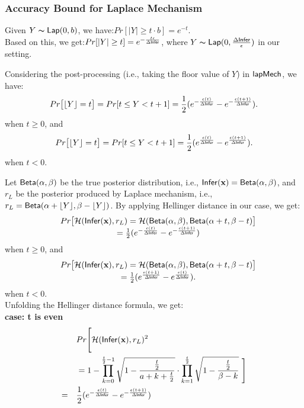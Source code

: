 \documentclass{article}
\begin{document}
\subsubsection{Accuracy Bound for Laplace Mechanism}
\label{subsec_accuracy_lap}
Given $Y \thicksim \mathsf{Lap}(0, b)$, we have\cite{dwork2014algorithmic}:$Pr[|Y| \geq t \cdot b] = e^{- t}.$\\
Based on this, we get:$Pr[|Y| \geq t] = e^{- \frac{t \epsilon}{\Delta \mathsf{Infer}}}$, where $Y \thicksim \mathsf{Lap}(0, \frac{\Delta \mathsf{Infer}}{\epsilon})$ in our setting.

Considering the post-processing (i.e., taking the floor value of $Y$) in $\mathsf{lapMech}$, we have:
\[
Pr\big[\lfloor Y \rfloor = t\big] 
= Pr[ t \leq Y < t + 1] 
= \frac{1}{2} (e^{- \frac{\epsilon (t)}{\Delta \mathsf{Infer}}} - e^{- \frac{\epsilon (t + 1)}{\Delta \mathsf{Infer}}}).
\]
when $t \geq 0$, and
\[
Pr\big[\lfloor Y \rfloor = t\big] 
= Pr[ t \leq Y < t + 1] 
= \frac{1}{2} (e^{\frac{\epsilon (t)}{\Delta \mathsf{Infer}}} - e^{\frac{\epsilon (t + 1)}{\Delta \mathsf{Infer}}}).
\]
when $t < 0$.

Let $\mathsf{Beta}(\alpha, \beta)$ be the true posterior distribution, i.e., $\mathsf{Infer}(\textbf{x}) = \mathsf{Beta}(\alpha, \beta)$, and $r_L$ be the posterior produced by Laplace mechanism, i.e., $r_L = \mathsf{Beta}(\alpha + \lfloor Y \rfloor, \beta - \lfloor Y \rfloor)$. By applying Hellinger distance in our case, we get:
$$
\begin{array}{rcl}
& Pr\big[\mathcal{H}(\mathsf{Infer}(\textbf{x}), r_L ) 
= \mathcal{H}(\mathsf{Beta}(\alpha, \beta), \mathsf{Beta}(\alpha + t, \beta - t)\big] \\
& =  \frac{1}{2} (e^{- \frac{\epsilon (t)}{\Delta \mathsf{Infer}}} - e^{- \frac{\epsilon (t + 1)}{\Delta \mathsf{Infer}}})\\
\end{array}
$$
when $t \geq 0$, and\\
$$
\begin{array}{rcl}
& Pr\big[\mathcal{H}(\mathsf{Infer}(\textbf{x}), r_L ) 
= \mathcal{H}(\mathsf{Beta}(\alpha, \beta), \mathsf{Beta}(\alpha + t, \beta - t)\big]\\
& = \frac{1}{2} (e^{\frac{\epsilon (t + 1)}{\Delta \mathsf{Infer}}} - e^{\frac{\epsilon (t)}{\Delta \mathsf{Infer}}}).
\end{array}
$$
when $t < 0$.\\
Unfolding the Hellinger distance formula, we get:\\
  \noindent \textbf{case: t is even}\\
  \begin{align*}
  & Pr\Bigg[\mathcal{H}(\mathsf{Infer}(\textbf{x}), r_L )^2 \\
  & = 1 - \prod_{k = 0}^{\frac{t}{2} - 1}
  \sqrt{1 - \frac{\frac{t}{2}}{a + k + \frac{t}{2}}}
  \cdot
  \prod_{k = 1}^{\frac{t}{2}}
  \sqrt{1 - \frac{\frac{t}{2}}{\beta - k}}\ \Bigg] \\
  = \quad & \frac{1}{2} (e^{- \frac{\epsilon (t)}{\Delta \mathsf{Infer}}} - e^{- \frac{\epsilon (t + 1)}{\Delta \mathsf{Infer}}})\\
  \end{align*}
\end{document}
